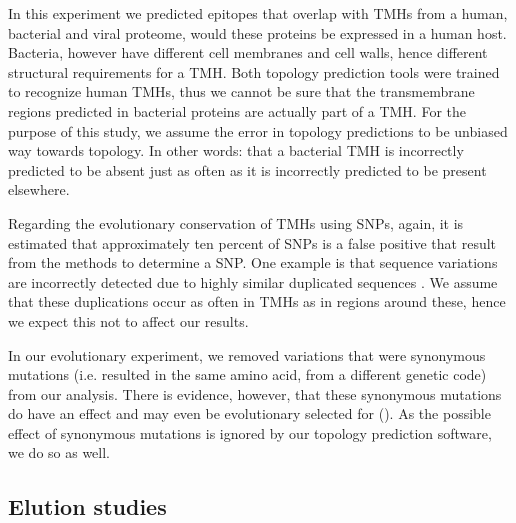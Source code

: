 In this experiment we predicted epitopes that overlap with 
TMHs from a human, bacterial and viral proteome,
would these proteins be expressed in a human host.
Bacteria, however have different cell membranes and cell walls, 
hence different structural requirements for a TMH.
Both topology prediction tools were trained to recognize
human TMHs, thus we cannot be sure that
the transmembrane regions predicted in bacterial proteins
are actually part of a TMH.
For the purpose of this study, we assume the 
error in topology predictions to be unbiased way towards topology.
In other words: that a bacterial TMH is incorrectly
predicted to be absent just as often as it is incorrectly
predicted to be present elsewhere.


Regarding the evolutionary conservation of TMHs using SNPs,
again, it is estimated that approximately ten percent
of SNPs is a false positive that result from the methods to determine
a SNP. One example is that sequence variations are incorrectly
detected due to highly similar duplicated sequences \cite{musumeci2010single}.
We assume that these duplications occur as often in TMHs as in
regions around these, hence we expect this not to affect our results.

%
In our evolutionary experiment, 
we removed variations that were synonymous mutations (i.e.
resulted in the same amino acid, from a different genetic code) 
from our analysis.
There is evidence, however, that these synonymous mutations
do have an effect and may even be evolutionary selected 
for (\cite{hunt2009silent}).
As the possible effect of synonymous mutations is ignored by our
topology prediction software, we do so as well.

\subsection{Elution studies}



